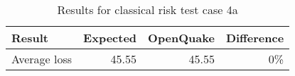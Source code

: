 \begin{table}[htbp]

\centering
\begin{tabular}{ l r r r }

\hline
\rowcolor{anti-flashwhite}
\bf{Result} & \bf{Expected} & \bf{OpenQuake} & \bf{Difference}\\
\hline
Average loss & 45.55 & 45.55 & 0\% \\
\hline
\end{tabular}

\caption{Results for classical risk test case 4a}
\label{tab:result-cr-4a}
\end{table}